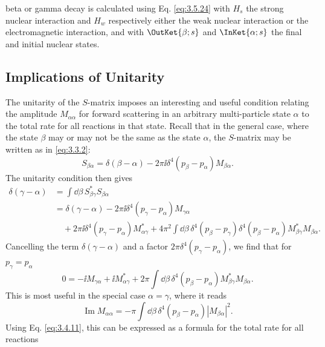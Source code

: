 beta or gamma decay is calculated using Eq. \eqref{eq:3.5.24} with $H_s$ the strong nuclear interaction
and $H_w$ respectively either the weak nuclear interaction or the electromagnetic interaction,
and with $\OutKet{\beta;s}$ and $\InKet{\alpha;s}$ the final and initial
nuclear states.

\subsection{Implications of Unitarity}

The unitarity of the $S$-matrix imposes an interesting and useful condition relating the amplitude
$M_{\alpha\alpha}$ for forward scattering in an arbitrary multi-particle state $\alpha$ to the
total rate for all reactions in that state. Recall that in the general case, where the state
$\beta$ may or may not be the same as the state $\alpha$, the $S$-matrix may be written as in
\eqref{eq:3.3.2}:
\[
 S_{\beta\alpha}=\delta(\beta-\alpha)-2\pi \ii\delta^4(p_\beta-p_\alpha)M_{\beta\alpha}.
\]
The unitarity condition then gives
\begin{align*}
 \delta(\gamma-\alpha)&=\int \dd\beta\,S^*_{\beta\gamma}S_{\beta\alpha}\\
 &=\delta(\gamma-\alpha)-2\pi \ii\delta^4(p_\gamma-p_\alpha)M_{\gamma\alpha}\\
 &\quad+2\pi \ii\delta^4(p_\gamma-p_\alpha)M^*_{\alpha\gamma}
 +4\pi^2\int \dd\beta\,\delta^4(p_\beta-p_\gamma)
 \delta^4(p_\beta-p_\alpha)M^*_{\beta\gamma}M_{\beta\alpha}.
\end{align*}
Cancelling the term $\delta(\gamma-\alpha)$ and a factor
$2\pi\delta^4(p_\gamma-p_\alpha)$, we find that for $p_\gamma=p_\alpha$
\begin{equation}
 0=-\ii M_{\gamma\alpha}+\ii M^*_{\alpha\gamma}
 +2\pi\int \dd\beta\,\delta^4(p_\beta-p_\alpha)M^*_{\beta\gamma}M_{\beta\alpha}.
 \tag{3.6.1}\label{eq:3.6.1}
\end{equation}
This is most useful in the special case $\alpha=\gamma$, where it reads
\begin{equation}
 \operatorname{Im}M_{\alpha\alpha}
 =-\pi\int \dd\beta\,\delta^4(p_\beta-p_\alpha)|M_{\beta\alpha}|^2.
 \tag{3.6.2}\label{eq:3.6.2}
\end{equation}
Using Eq. \eqref{eq:3.4.11}, this can be expressed as a formula for the total rate for all reactions
